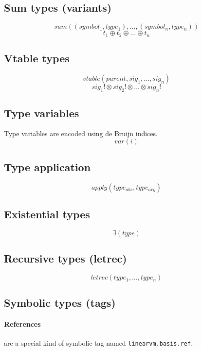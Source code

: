 \documentclass[a4paper]{report}
\begin{document}

\subsection{Sum types (variants)}
$$ \mathit{sum((symbol_1, type_1), \ldots, (symbol_n, type_n))} $$
$$ t_1 \oplus t_2 \oplus \ldots \oplus t_n $$

\subsection{Vtable types}
$$ \mathit{vtable(parent, sig_1, \ldots, sig_n)} $$
$$ sig_1! \otimes sig_2! \otimes \ldots \otimes sig_n! $$

\subsection{Type variables}
Type variables are encoded using de Bruijn indices.
$$ \mathit{var(i)} $$

\subsection{Type application}
$$ \mathit{apply(type_{abs},type_{arg})} $$

\subsection{Existential types}
$$ \mathit{\exists(type)} $$

\subsection{Recursive types (letrec)}
$$ \mathit{letrec(type_1, \ldots, type_n)} $$

\subsection{Symbolic types (tags)}

\paragraph{References} are a special kind of symbolic tag
named \texttt{linearvm.basis.ref}.
\end{document}
